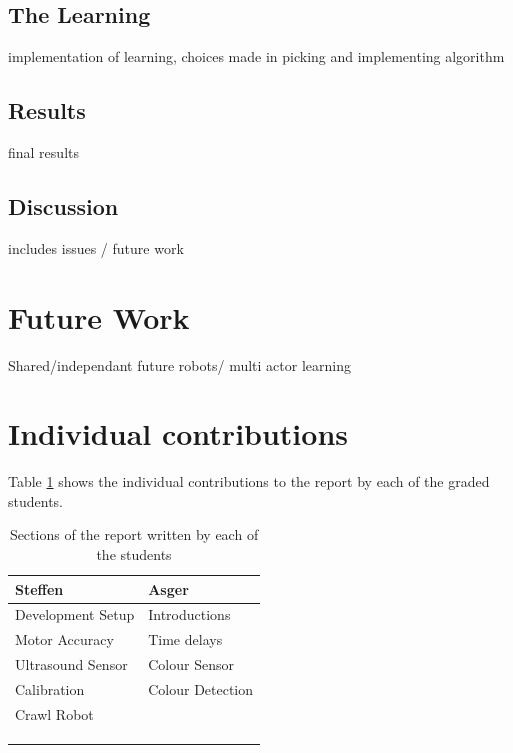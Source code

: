 \documentclass[11pt, a4paper]{article}
\begin{document}
\subsection{The Learning}
implementation of learning, choices made in picking and implementing algorithm
\subsection{Results}
final results
\subsection{Discussion}
includes issues / future work

\section{Future Work}
Shared/independant
future robots/  multi actor learning

\section{Individual contributions}
Table \ref{tab:contributions} shows the individual contributions to the report by each of the graded students.
\begin{table}[H]
	\centering
	\begin{tabular}{l|l}
		Steffen & Asger \\ \hline
		Development Setup & Introductions\\
		Motor Accuracy & Time delays\\
		Ultrasound Sensor & Colour Sensor\\
		Calibration & Colour Detection\\
        Crawl Robot & \\
	     & \\
	     & \\
	     & \\
     
		      
	\end{tabular}
	\caption{Sections of the report written by each of the students}
	\label{tab:contributions}
\end{table}




\end{document}
